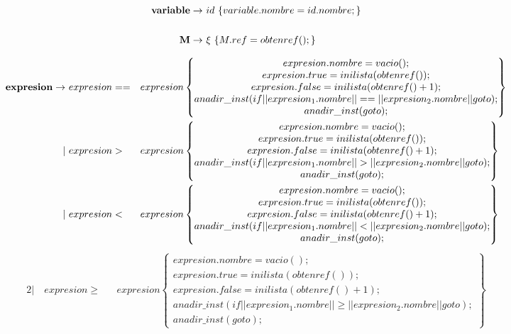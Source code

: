 \documentclass[12pt,a4paper,landscape]{article}
\theoremstyle{mytheor}
\begin{document}
\begin{center}
  \begin{alignat*}{2}
     \text{\textbf{variable}} \to\ & id\ \{variable.nombre = id.nombre;\} \\\\
     \text{\textbf{M}} \to\ &\xi\ \{M.ref=obtenref();\}
  \end{alignat*}
\end{center}

\begin{center}
  \begin{alignat*}{2}
     \text{\textbf{expresion}} \to\ &  expresion == && expresion \begin{Bmatrix} expresion.nombre = vacio();\\ expresion.true=inilista(obtenref()); \\  expresion.false=inilista(obtenref()+1);\\ anadir\_inst(if||expresion_1.nombre||==||expresion_2.nombre||goto);\\ anadir\_inst(goto);\end{Bmatrix} \\
    |\ & expresion > && expresion                \begin{Bmatrix} expresion.nombre = vacio();\\ expresion.true=inilista(obtenref()); \\  expresion.false=inilista(obtenref()+1);\\ anadir\_inst(if||expresion_1.nombre||>||expresion_2.nombre||goto);\\ anadir\_inst(goto);\end{Bmatrix} \\
    |\ & expresion < && expresion                   \begin{Bmatrix} expresion.nombre = vacio();\\ expresion.true=inilista(obtenref()); \\  expresion.false=inilista(obtenref()+1);\\ anadir\_inst(if||expresion_1.nombre||<||expresion_2.nombre||goto);\\ anadir\_inst(goto);\end{Bmatrix} \\
  \end{alignat*}
  \begin{alignat*}{2}
    |\ & expresion \geq && expresion                \begin{Bmatrix} expresion.nombre = vacio();\\ expresion.true=inilista(obtenref()); \\  expresion.false=inilista(obtenref()+1);\\ anadir\_inst(if||expresion_1.nombre||\geq||expresion_2.nombre||goto);\\ anadir\_inst(goto);\end{Bmatrix} \\

\end{alignat*}
\end{center}
\end{document}
